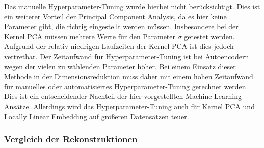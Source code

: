 Das manuelle Hyperparameter-Tuning wurde hierbei nicht berücksichtigt. Dies ist ein weiterer
Vorteil der Principal Component Analysis, da es hier keine Parameter gibt, die richtig eingestellt
werden müssen. Insbesondere bei der Kernel PCA müssen mehrere Werte für den Parameter $\sigma$
getestet werden. Aufgrund der relativ niedrigen Laufzeiten der Kernel PCA ist dies jedoch
vertretbar. Der Zeitaufwand für Hyperparameter-Tuning ist bei Autoencodern wegen der vielen zu
wählenden Parameter höher. Bei einem Einsatz dieser Methode in der Dimensionsreduktion muss daher
mit einem hohen Zeitaufwand für manuelles oder automatisiertes Hyperparameter-Tuning gerechnet
werden. Dies ist ein entscheidender Nachteil der hier vorgestellten Machine Learning Ansätze.
Allerdings wird das Hyperparameter-Tuning auch für Kernel PCA und Locally Linear Embedding auf
größeren Datensätzen teuer.

\subsubsection{Vergleich der Rekonstruktionen}

